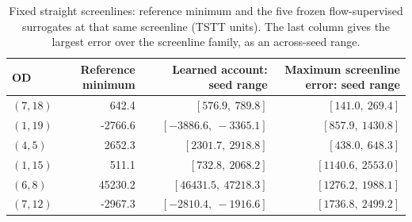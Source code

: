 \begin{table}[pos=htbp]
\caption{Fixed straight screenlines: reference minimum and the five frozen flow-supervised surrogates at that same screenline (TSTT units). The last column gives the largest error over the screenline family, as an across-seed range.}
\label{tab:screenlinelearned}
\small\begin{tabular*}{\tblwidth}{@{\extracolsep{\fill}}lrrr}\toprule
OD & Reference minimum & Learned account: seed range & Maximum screenline error: seed range\\\midrule
$(7,18)$ & 642.4 & $[576.9,\ 789.8]$ & $[141.0,\ 269.4]$ \\
$(1,19)$ & -2766.6 & $[-3886.6,\ -3365.1]$ & $[857.9,\ 1430.8]$ \\
$(4,5)$ & 2652.3 & $[2301.7,\ 2918.8]$ & $[438.0,\ 648.3]$ \\
$(1,15)$ & 511.1 & $[732.8,\ 2068.2]$ & $[1140.6,\ 2553.0]$ \\
$(6,8)$ & 45230.2 & $[46431.5,\ 47218.3]$ & $[1276.2,\ 1988.1]$ \\
$(7,12)$ & -2967.3 & $[-2810.4,\ -1916.6]$ & $[1736.8,\ 2499.2]$ \\
\bottomrule\end{tabular*}\end{table}
